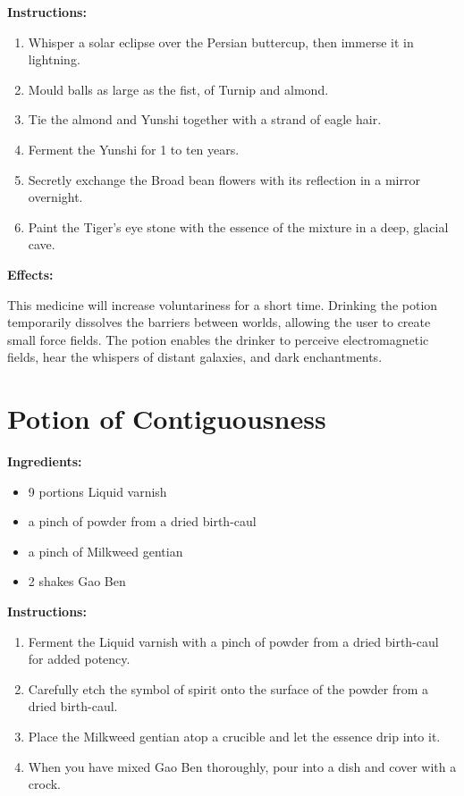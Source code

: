 \documentclass{article}
\begin{document}
\textbf{Instructions:}

\begin{enumerate}
  \item Whisper a solar eclipse over the Persian buttercup, then immerse it in lightning.
  \item Mould balls as large as the fist, of Turnip and almond.
  \item Tie the almond and Yunshi together with a strand of eagle hair.
  \item Ferment the Yunshi for 1 to ten years.
  \item Secretly exchange the Broad bean flowers with its reflection in a mirror overnight.
  \item Paint the Tiger's eye stone with the essence of the mixture in a deep, glacial cave.
\end{enumerate}

\textbf{Effects:}

This medicine will increase voluntariness for a short time. Drinking the potion temporarily dissolves the barriers between worlds, allowing the user to create small force fields. The potion enables the drinker to perceive electromagnetic fields, hear the whispers of distant galaxies, and dark enchantments.

\newpage
\section*{Potion of Contiguousness}

\textbf{Ingredients:}

\begin{itemize}
  \item 9 portions Liquid varnish
  \item a pinch of powder from a dried birth-caul
  \item a pinch of Milkweed gentian
  \item 2 shakes Gao Ben
\end{itemize}

\textbf{Instructions:}

\begin{enumerate}
  \item Ferment the Liquid varnish with a pinch of powder from a dried birth-caul for added potency.
  \item Carefully etch the symbol of spirit onto the surface of the powder from a dried birth-caul.
  \item Place the Milkweed gentian atop a crucible and let the essence drip into it.
  \item When you have mixed Gao Ben thoroughly, pour into a dish and cover with a crock.
\end{enumerate}
\end{document}

